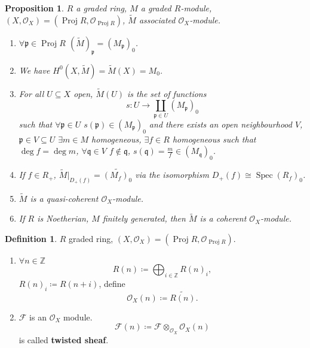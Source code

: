 \documentclass[12pt]{article}
\DeclareMathOperator{\Spec}{Spec}
\DeclareMathOperator{\Proj}{Proj}
\newtheorem*{proposition}{Proposition}
\theoremstyle{definition}
\newtheorem*{definition}{Definition}
\begin{document}
\begin{proposition}
$R$ a graded ring, $M$ a graded $R$-module, $(X,\mathcal{O}_X)=(\Proj R,\mathcal{O}_{\Proj R})$, $\widetilde{M}$ associated $\mathcal{O}_X$-module.

\begin{enumerate}[label=\arabic*)]
\item $\forall\mathfrak{p}\in\Proj R$ $(\widetilde{M})_{\mathfrak{p}}=(M_{\mathfrak{p}})_0$.

\item We have $H^0(X,\widetilde{M})=\widetilde{M}(X)=M_0$.

\item For all $U\subseteq X$ open, $\widetilde{M}(U)$ is the set of functions
\[s:U\rightarrow\coprod_{\mathfrak{p}\in U}(M_{\mathfrak{p}})_0\]
such that $\forall\mathfrak{p}\in U$ $s(\mathfrak{p})\in(M_{\mathfrak{p}})_0$ and there exists an open neighbourhood $V$, $\mathfrak{p}\in V\subseteq U$ $\exists m\in M$ homogeneous, $\exists f\in R$ homogeneous such that $\deg f=\deg m$, $\forall\mathfrak{q}\in V$ $f\notin\mathfrak{q}$, $s(\mathfrak{q})=\frac{m}{f}\in(M_{\mathfrak{q}})_0$.

\item If $f\in R_+$, $\widetilde{M}|_{D_+(f)}=\widetilde{(M_f)_0}$ via the isomorphism $D_+(f)\cong\Spec(R_f)_0$.

\item $\widetilde{M}$ is a quasi-coherent $\mathcal{O}_X$-module.

\item If $R$ is Noetherian, $M$ finitely generated, then $\widetilde{M}$ is a coherent $\mathcal{O}_X$-module.
\end{enumerate}
\end{proposition}

\begin{definition}
$R$ graded ring, $(X,\mathcal{O}_X)=(\Proj R,\mathcal{O}_{\Proj R})$.

\begin{enumerate}[label=\arabic*)]
\item $\forall n\in\mathbb{Z}$
\[R(n)\coloneqq\bigoplus_{i\in\mathbb{Z}}R(n)_i,\]
$R(n)_i\coloneqq R(n+i)$, define
\[\mathcal{O}_X(n)\coloneqq\widetilde{R(n)}.\]

\item $\mathcal{F}$ is an $\mathcal{O}_X$ module.
\[\mathcal{F}(n)\coloneqq\mathcal{F}\otimes_{\mathcal{O}_X}\mathcal{O}_X(n)\]
is called \textbf{twisted sheaf}.
\end{enumerate}
\end{definition}
\end{document}
